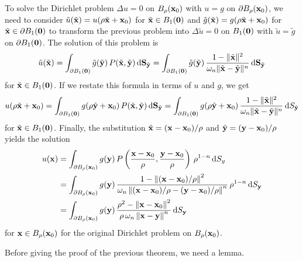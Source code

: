 \begin{rmk}
To solve the Dirichlet problem    \label{laplace_exist_a_ball}
$\Delta u = 0$ on $B_\rho(\mathbf{x}_0)$ with $u=g$ on
$\partial B_\rho(\mathbf{x}_0)$, we need to consider
$\tilde{u}(\tilde{\mathbf{x}}) = u(\rho \tilde{\mathbf{x}} + \mathbf{x}_0)$ for
$\tilde{\mathbf{x}} \in B_1(\mathbf{0})$ and
$\tilde{g}(\tilde{\mathbf{x}}) = g(\rho \tilde{\mathbf{x}} + \mathbf{x}_0)$ for
$\tilde{\mathbf{x}} \in \partial B_1(\mathbf{0})$ to transform the previous
problem into  $\Delta \tilde{u} = 0$ on $B_1(\mathbf{0})$ with
$\tilde{u}=\tilde{g}$ on $\partial B_1(\mathbf{0})$.
The solution of this problem is
\[
\tilde{u}(\tilde{\mathbf{x}}) = \int_{\partial B_1(\mathbf{0})}
\tilde{g}(\tilde{\mathbf{y}}) \,
P(\tilde{\mathbf{x}},\tilde{\mathbf{y}}) \,\mathrm{d}{\mathbf{S}_{\tilde{\mathbf{y}}}}
= \int_{\partial B_1(\mathbf{0})}
\tilde{g}(\tilde{\mathbf{y}}) \, \frac{1-\|\tilde{\mathbf{x}}\|^2}
{\omega_n \|\tilde{\mathbf{x}}-\tilde{\mathbf{y}}\|^n}
\,\mathrm{d}{\mathbf{S}_{\tilde{\mathbf{y}}}}
\]
for $\tilde{\mathbf{x}} \in B_1(\mathbf{0})$.
If we restate this formula in terms of $u$ and $g$, we get
\[
u(\rho \tilde{\mathbf{x}} +\mathbf{x}_0) = \int_{\partial B_1(\mathbf{0})}
g(\rho\tilde{\mathbf{y}}+\mathbf{x}_0) \, P(\tilde{\mathbf{x}},\tilde{\mathbf{y}})
\,\mathrm{d}{\mathbf{S}_{\tilde{\mathbf{y}}}}
= \int_{\partial B_1(\mathbf{0})}
g(\rho \tilde{\mathbf{y}} + \mathbf{x}_0) \,
\frac{1-\|\tilde{\mathbf{x}}\|^2}{\omega_n \|\tilde{\mathbf{x}}-\tilde{\mathbf{y}}\|^n}
\,\mathrm{d}{S_{\tilde{\mathbf{y}}}}
\]
for $\tilde{\mathbf{x}} \in B_1(\mathbf{0})$.
Finally, the substitution $\tilde{\mathbf{x}} = (\mathbf{x}-\mathbf{x}_0)/\rho$
and $\tilde{\mathbf{y}} = (\mathbf{y}-\mathbf{x}_0)/\rho$ yields the solution
\begin{align}
u(\mathbf{x}) &= \int_{\partial B_\rho(\mathbf{x}_0)}
g(\mathbf{y}) \, P\left(\frac{\mathbf{x}-\mathbf{x}_0}{\rho},
\frac{\mathbf{y}-\mathbf{x}_0}{\rho}\right) \,\rho^{1-n}
\,\mathrm{d}{S}_{y} \nonumber \\
&= \int_{\partial B_\rho(\mathbf{x}_0)} g(\mathbf{y}) \,
\frac{1-\left\|(\mathbf{x}-\mathbf{x}_0)/\rho\right\|^2}
{\omega_n \left\|(\mathbf{x}-\mathbf{x}_0)/\rho -
(\mathbf{y}-\mathbf{x}_0)/\rho\right\|^n}
\, \rho^{1-n} \,\mathrm{d}{S}_{\mathbf{y}} \nonumber \\
&=\int_{\partial B_\rho(\mathbf{x}_0)} g(\mathbf{y}) \,
\frac{\rho^2-\left\|\mathbf{x}-\mathbf{x}_0\right\|^2}
{\rho \, \omega_n \left\|\mathbf{x}-\mathbf{y}\right\|^n}
\,\mathrm{d}{S}_{\mathbf{y}}  \label{laplace_ball_formula}
\end{align}
for $\mathbf{x} \in B_\rho(\mathbf{x}_0)$
for the original Dirichlet problem on $B_\rho(\mathbf{x}_0)$.
\end{rmk}

Before giving the proof of the previous theorem, we need a lemma.

